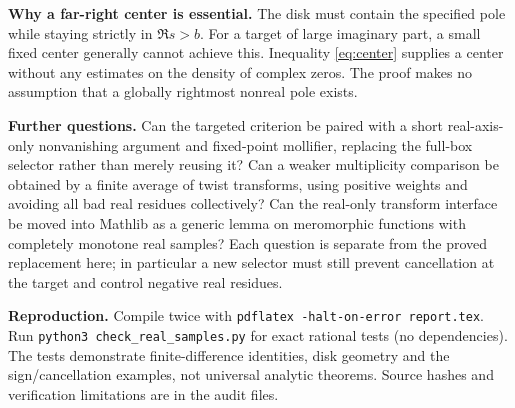\documentclass[11pt,letterpaper]{article}
\theoremstyle{remark}\newtheorem{remark}[theorem]{Remark}
\begin{document}
\textbf{Why a far-right center is essential.} The disk must contain the specified pole while staying strictly in $\Re s>b$. For a target of large imaginary part, a small fixed center generally cannot achieve this. Inequality \eqref{eq:center} supplies a center without any estimates on the density of complex zeros. The proof makes no assumption that a globally rightmost nonreal pole exists.

\textbf{Further questions.} Can the targeted criterion be paired with a short real-axis-only nonvanishing argument and fixed-point mollifier, replacing the full-box selector rather than merely reusing it? Can a weaker multiplicity comparison be obtained by a finite average of twist transforms, using positive weights and avoiding all bad real residues collectively? Can the real-only transform interface be moved into Mathlib as a generic lemma on meromorphic functions with completely monotone real samples? Each question is separate from the proved replacement here; in particular a new selector must still prevent cancellation at the target and control negative real residues.

\smallskip\textbf{Reproduction.} Compile twice with \texttt{pdflatex -halt-on-error report.tex}. Run \texttt{python3 check\_real\_samples.py} for exact rational tests (no dependencies). The tests demonstrate finite-difference identities, disk geometry and the sign/cancellation examples, not universal analytic theorems. Source hashes and verification limitations are in the audit files.
\end{document}
